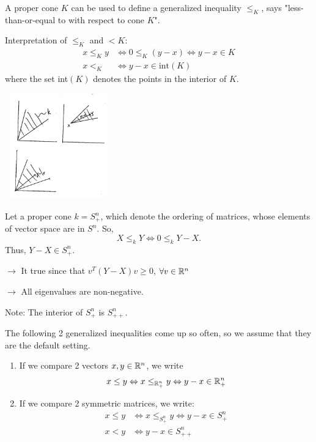 A proper cone $K$ can be used to define a generalized inequality $\leq_K$, says "less-than-or-equal to with respect to cone $K$".

Interpretation of $\leq_K$ and $< K$:
\begin{align*}
x\leq_K y &\Leftrightarrow 0\leq_K (y-x)\Leftrightarrow y - x \in K\\
x <_K &\Leftrightarrow y-x\in \text{int}(K)
\end{align*}
where the set int$(K)$ denotes the points in the interior of $K$.

\begin{marginfigure}
	\centering
	\includegraphics[width=1.8in,height=1.8in]{figures/ch08/figure1030_1.png}
\end{marginfigure}


\begin{example}
	Let a proper cone $k = S^n_+$, which denote the ordering of matrices, whose elements of vector space are in $S^n$. So,
	$$X\leq_k Y \Leftrightarrow 0\leq_k Y-X.$$
	Thus, $Y-X\in S^n_+$.
	
	$\rightarrow$ It true since that $v^T(Y-X)v \geq 0$, $\forall v\in \mathbb{R}^n$
	
	$\rightarrow$ All eigenvalues are non-negative.
	
	Note: The interior of $S_+^n$ is $S^n_{++}$.
	
\end{example}

\vspace{0.3cm}
The following 2 generalized inequalities come up so often, so we assume that they are the default setting.
\begin{enumerate}
	\item If we compare 2 vectors $x,y\in \mathbb{R}^n$, we write 
	$$x\leq  y\Leftrightarrow x\leq_{\mathbb{R}^n_{+}}y \Leftrightarrow y-x\in \mathbb{R}^n_{+}$$ 
	
	\item If we compare 2 symmetric matrices, we write:
	\begin{align*}
	x\leq y &\Leftrightarrow x\leq_{S_+^n} y\Leftrightarrow y - x\in S^n_{+}\\
	x< y &\Leftrightarrow y - x\in S^n_{++}
	\end{align*}
\end{enumerate}

